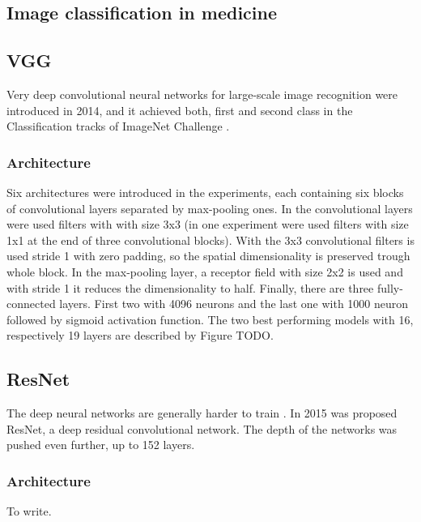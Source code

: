 \subsection{Image classification in medicine}


\subsection{VGG}
Very deep convolutional neural networks for large-scale image recognition \cite{VGG} were 
introduced in 2014, and it achieved both, first and second class in the Classification tracks of 
ImageNet Challenge \cite{IN2014}.


\subsubsection{Architecture}
Six architectures were introduced in the experiments, each containing six blocks of convolutional
layers separated by max-pooling ones. In the convolutional layers were used filters with
with size 3x3 (in one experiment were used filters with size 1x1 at the end of three convolutional blocks).
With the 3x3 convolutional filters is used stride 1 with zero padding, so the spatial dimensionality
is preserved trough whole block. In the max-pooling layer, a receptor field with size 2x2 is used and with stride 1 it 
reduces the dimensionality to half. Finally, there are three fully-connected layers. First two with 4096 neurons and
the last one with 1000 neuron followed by sigmoid activation function. The two best performing models with 16, respectively 19
layers are described by Figure TODO.




\subsection{ResNet}
The deep neural networks are generally harder to train \cite{HardDnn}. In 2015 was proposed ResNet\cite{ResNet}, 
a deep residual convolutional network. The depth of the networks was pushed even further, up to 152 layers. 


\subsubsection{Architecture}
To write.




